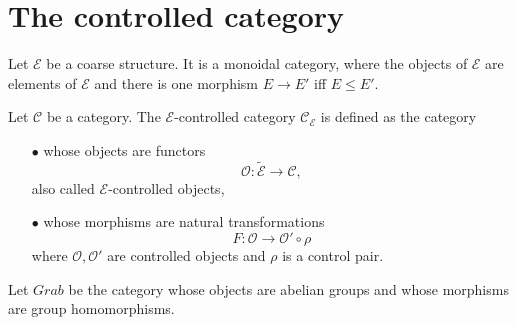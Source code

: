 \section{The controlled category}

Let $\mathcal E$ be a coarse structure. It is a monoidal category, where the objects of $\mathcal E$ are elements of $\mathcal E$ and there is one morphism $E\rightarrow E'$ iff $E\leq E'$.\\

\begin{definition}
Let $\mathcal C$ be a category. The $\mathcal E$-controlled category $\mathcal C_{\mathcal E}$ is defined as the category \begin{itemize}
\item[$\bullet$] whose objects are functors
\[\mathcal O : \tilde{\mathcal  E} \rightarrow \mathcal C,\]
also called $\mathcal E$-controlled objects,
\item[$\bullet$] whose morphisms are natural transformations
\[ F : \mathcal O \rightarrow \mathcal O'\circ \rho\]
where $\mathcal O,\mathcal O'$ are controlled objects and $\rho$ is a control pair.
\end{itemize}
\end{definition}

Let $Grab$ be the category whose objects are abelian groups and whose morphisms are group homomorphisms.